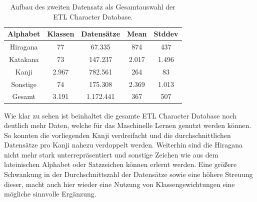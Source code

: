 \documentclass[twoside,a4paper]{IEEEtran}
\begin{document}
\begin{table}[!htb]
	\caption{Aufbau des zweiten Datensatz als Gesamtauswahl der ETL Character Database.}
	\label{data_total}
	\centering
	\begin{tabular}{|c|c|c|c|c|}
		\hline
		Alphabet & Klassen & Datensätze & Mean & Stddev\\
		\hline
		\hline
		Hiragana & 77 & 67.335 & 874 & 437\\
		\hline 
		Katakana & 73 & 147.237 & 2.017 & 1.496\\
		\hline
		Kanji & 2.967 & 782.561 & 264 & 83\\
		\hline
		Sonstige & 74 & 175.308 & 2.369 & 1.013\\
		\hline
		\hline
		Gesamt & 3.191 & 1.172.441 & 367 & 507\\
		\hline
	\end{tabular}
\end{table}
Wie klar zu sehen ist beinhaltet die gesamte ETL Character Database noch deutlich mehr Daten, welche für das Maschinelle Lernen genutzt werden können. So konnten die vorliegenden Kanji verdreifacht und die durchschnittlichen Datensätze pro Kanji nahezu verdoppelt werden. Weiterhin sind die Hiragana nicht mehr stark unterrepräsentiert und sonstige Zeichen wie aus dem lateinischen Alphabet oder Satzzeichen können erlernt werden. Eine größere Schwankung in der Durchschnittszahl der Datensätze sowie eine höhere Streuung dieser, macht auch hier wieder eine Nutzung von Klassengewichtungen eine mögliche sinnvolle Ergänzung.
\end{document}
